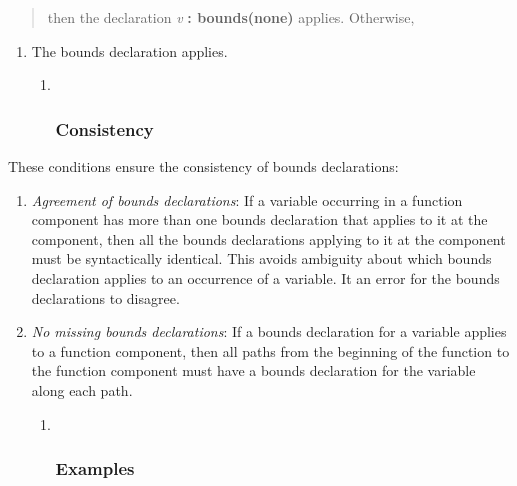 \documentclass[]{article}
\begin{document}
\begin{quote}
then the declaration \emph{v} \textbf{: bounds(none)} applies.
Otherwise,
\end{quote}

\begin{enumerate}
\def\labelenumi{\arabic{enumi}.}
\item
  The bounds declaration applies.

  \begin{enumerate}
  \def\labelenumii{\arabic{enumii}.}
  \item ~
    \subsubsection{\texorpdfstring{\protect\hypertarget{ux5fToc435434940}{}{\protect\hypertarget{ux5fToc437460766}{}{\protect\hypertarget{ux5fToc440445444}{}{\protect\hypertarget{ux5fToc440449226}{}{\protect\hypertarget{ux5fToc440551876}{}{}}}}}Consistency}{Consistency}}\label{consistency}
  \end{enumerate}
\end{enumerate}

These conditions ensure the consistency of bounds declarations:

\begin{enumerate}
\def\labelenumi{\arabic{enumi}.}
\item
  \emph{Agreement of bounds declarations}: If a variable occurring in a
  function component has more than one bounds declaration that applies
  to it at the component, then all the bounds declarations applying to
  it at the component must be syntactically identical. This avoids
  ambiguity about which bounds declaration applies to an occurrence of a
  variable. It an error for the bounds declarations to disagree.
\item
  \emph{No missing bounds declarations}: If a bounds declaration for a
  variable applies to a function component, then all paths from the
  beginning of the function to the function component must have a bounds
  declaration for the variable along each path.

  \begin{enumerate}
  \def\labelenumii{\arabic{enumii}.}
  \item ~
    \subsubsection{\texorpdfstring{\protect\hypertarget{ux5fToc435434941}{}{\protect\hypertarget{ux5fToc437460767}{}{\protect\hypertarget{ux5fToc440445445}{}{\protect\hypertarget{ux5fToc440449227}{}{\protect\hypertarget{ux5fToc440551877}{}{}}}}}Examples}{Examples}}\label{examples}
  \end{enumerate}
\end{enumerate}
\end{document}
